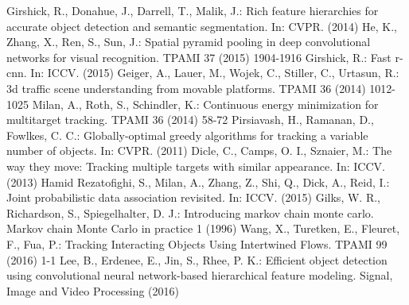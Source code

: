 \documentclass[runningheads]{llncs}
\begin{document}
\begin{thebibliography}{99}
Girshick, R., Donahue, J., Darrell, T., Malik, J.: Rich feature hierarchies for accurate object detection and semantic segmentation. In: CVPR. (2014)
He, K., Zhang, X., Ren, S., Sun, J.: Spatial pyramid pooling in deep convolutional networks for visual recognition. TPAMI 37 (2015) 1904-1916
Girshick, R.: Fast r-cnn. In: ICCV. (2015)
Geiger, A., Lauer, M., Wojek, C., Stiller, C., Urtasun, R.: 3d traffic scene understanding from movable platforms. TPAMI 36 (2014) 1012-1025
Milan, A., Roth, S., Schindler, K.: Continuous energy minimization for multitarget tracking. TPAMI 36 (2014) 58-72
Pirsiavash, H., Ramanan, D., Fowlkes, C. C.: Globally-optimal greedy algorithms for tracking a variable number of objects. In: CVPR. (2011)
Dicle, C., Camps, O. I., Sznaier, M.: The way they move: Tracking multiple targets with similar appearance. In: ICCV. (2013)
Hamid Rezatofighi, S., Milan, A., Zhang, Z., Shi, Q., Dick, A., Reid, I.: Joint probabilistic data association revisited. In: ICCV. (2015)
Gilks, W. R., Richardson, S., Spiegelhalter, D. J.: Introducing markov chain monte carlo. Markov chain Monte Carlo in practice 1 (1996)
Wang, X., Turetken, E., Fleuret, F., Fua, P.: Tracking Interacting Objects Using Intertwined Flows. TPAMI 99 (2016) 1-1
Lee, B., Erdenee, E., Jin, S., Rhee, P. K.: Efficient object detection using convolutional neural network-based hierarchical feature modeling. Signal, Image and Video Processing (2016)


\end{thebibliography}
\end{document}
